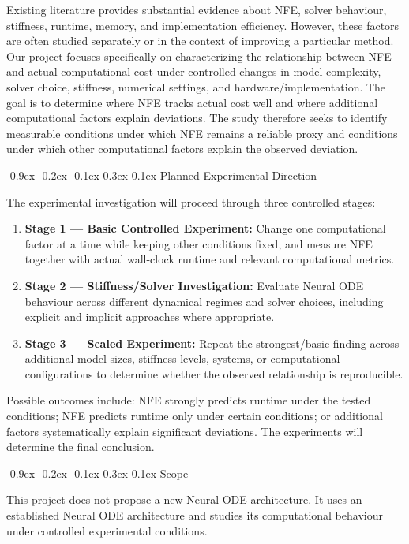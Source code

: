 \documentclass[10pt,a4paper]{article}
\makeatletter
\renewcommand{\section}{\@startsection{section}{1}{\z@}%
  {-0.9ex \@plus -0.2ex \@minus -0.1ex}%
  {0.3ex \@plus 0.1ex}%
  {\normalfont\normalsize\bfseries}}
\makeatother
\begin{document}
Existing literature provides substantial evidence about NFE, solver behaviour, stiffness, runtime, memory, and implementation efficiency. However, these factors are often studied separately or in the context of improving a particular method. Our project focuses specifically on characterizing the relationship between NFE and actual computational cost under controlled changes in model complexity, solver choice, stiffness, numerical settings, and hardware/implementation. The goal is to determine where NFE tracks actual cost well and where additional computational factors explain deviations. The study therefore seeks to identify measurable conditions under which NFE remains a reliable proxy and conditions under which other computational factors explain the observed deviation.

\section{Planned Experimental Direction}

The experimental investigation will proceed through three controlled stages:
\begin{enumerate}
    \item \textbf{Stage 1 --- Basic Controlled Experiment:} Change one computational factor at a time while keeping other conditions fixed, and measure NFE together with actual wall-clock runtime and relevant computational metrics.
    \item \textbf{Stage 2 --- Stiffness/Solver Investigation:} Evaluate Neural ODE behaviour across different dynamical regimes and solver choices, including explicit and implicit approaches where appropriate.
    \item \textbf{Stage 3 --- Scaled Experiment:} Repeat the strongest/basic finding across additional model sizes, stiffness levels, systems, or computational configurations to determine whether the observed relationship is reproducible.
\end{enumerate}
Possible outcomes include: NFE strongly predicts runtime under the tested conditions; NFE predicts runtime only under certain conditions; or additional factors systematically explain significant deviations. The experiments will determine the final conclusion.

\section{Scope}

This project does not propose a new Neural ODE architecture. It uses an established Neural ODE architecture and studies its computational behaviour under controlled experimental conditions.
\end{document}
